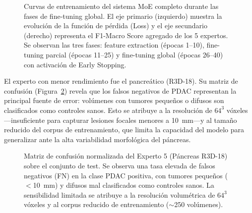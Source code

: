 \documentclass[conference, 11pt]{IEEEtran}
\begin{document}
\begin{figure}[H]
    \centering
    \caption{Curvas de entrenamiento del sistema MoE completo durante las fases de fine-tuning global. El eje primario (izquierdo) muestra la evolución de la función de pérdida (Loss) y el eje secundario (derecho) representa el F1-Macro Score agregado de los 5 expertos. Se observan las tres fases: feature extraction (épocas 1--10), fine-tuning parcial (épocas 11--25) y fine-tuning global (épocas 26--40) con activación de Early Stopping.}
    \label{fig:training_curves}
\end{figure}

El experto con menor rendimiento fue el pancreático (R3D-18). Su matriz de confusión (Figura~\ref{fig:confusion_pancreas}) revela que los falsos negativos de PDAC representan la principal fuente de error: volúmenes con tumores pequeños o difusos son clasificados como controles sanos. Esto se atribuye a la resolución de $64^3$ vóxeles ---insuficiente para capturar lesiones focales menores a 10~mm---y al tamaño reducido del corpus de entrenamiento, que limita la capacidad del modelo para generalizar ante la alta variabilidad morfológica del páncreas.

\begin{figure}[H]
    \centering
    \caption{Matriz de confusión normalizada del Experto 5 (Páncreas R3D-18) sobre el conjunto de test. Se observa una tasa elevada de falsos negativos (FN) en la clase PDAC positiva, con tumores pequeños ($<$10~mm) y difusos mal clasificados como controles sanos. La sensibilidad limitada se atribuye a la resolución volumétrica de $64^3$ vóxeles y al corpus reducido de entrenamiento ($\sim$250 volúmenes).}
    \label{fig:confusion_pancreas}
\end{figure}
\end{document}
